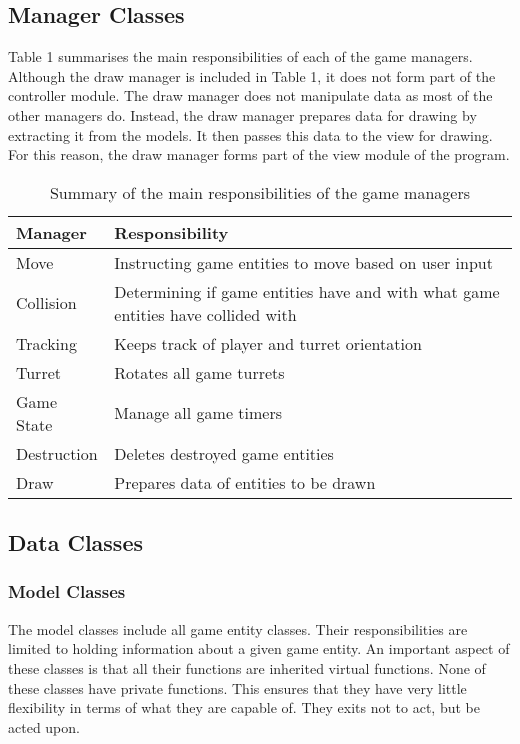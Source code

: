 \documentclass[10pt,twocolumn]{witseiepaper}
\begin{document}
\subsection{Manager Classes}
Table 1 summarises the main responsibilities of each of the game managers. Although the draw manager is included in Table 1, it does not form part of the controller module. The draw manager does not manipulate data as most of the other managers do. Instead, the draw manager prepares data for drawing by extracting it from the models. It then passes this data to the view for drawing. For this reason, the draw manager forms part of the view module of the program. 

\begin{table}[h]
	\centering
	\caption{Summary of the main responsibilities of the game managers}
	\begin{tabular}{|>{\centering\arraybackslash}m{2cm}|>{\centering\arraybackslash}m{4.5cm}|}
		\hline 
		\textbf{Manager} & \textbf{Responsibility} \\ 
		\hline 
		Move & Instructing game entities to move based on user input \\ 
		\hline 
		Collision & Determining if game entities have and with what game 								entities have collided with \\ 
		\hline 
		Tracking & Keeps track of player and turret orientation \\ 
		\hline 
		Turret & Rotates all game turrets \\ 
		\hline 
		Game State & Manage all game timers \\ 
		\hline 
		Destruction & Deletes destroyed game entities \\ 
		\hline 
		Draw & Prepares data of entities to be drawn \\ 
		\hline 
	\end{tabular} 
\end{table}

\subsection{Data Classes}
\subsubsection{Model Classes} The model classes include all game entity classes. Their responsibilities are limited to holding information about a given game entity. An important aspect of these classes is that all their functions are inherited virtual functions. None of these classes have private functions. This ensures that they have very little flexibility in terms of what they are capable of. They exits not to act, but be acted upon.
\end{document}

